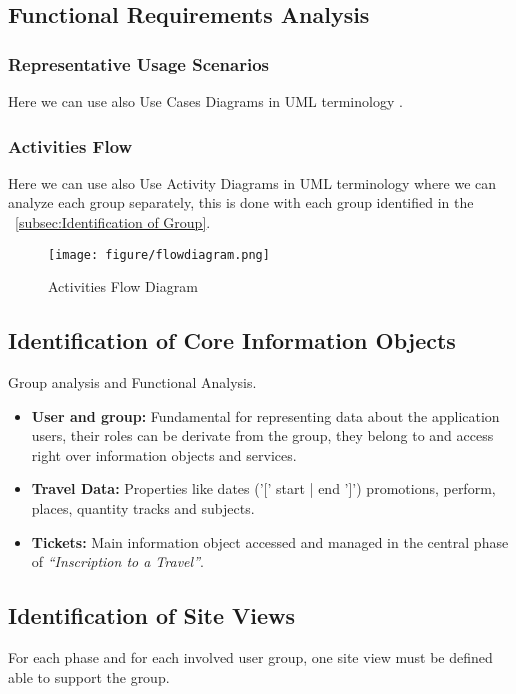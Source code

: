 \documentclass[a4paper]{memoir}
\begin{document}
	\subsection{Functional Requirements Analysis}
		\subsubsection{Representative Usage Scenarios}
			Here we can use also Use Cases Diagrams in \ac{UML} terminology \cite{Matera2003}.
		\subsubsection{Activities Flow}
			Here we can use also Use Activity Diagrams in \ac{UML} terminology \cite{Matera2003} where we can analyze each group separately, this is done with each group identified in the ~\ref{subsec:Identification of Group}.
			
			\begin{figure}[here]
				\texttt{[image: figure/flowdiagram.png]}
				\caption{Activities Flow Diagram}
				\label{fig:flowDiagram}
			\end{figure}
					
	\subsection{Identification of Core Information Objects}
		Group analysis and Functional Analysis.
		\begin{itemize}
			\item \textbf{User and group:} Fundamental for representing data about the application users, their roles can be derivate from the group, they belong to and access right over information objects and services.
			\item \textbf{Travel Data:} Properties like dates ('[' start | end ']') promotions, perform, places, quantity tracks and subjects.
			\item \textbf{Tickets:} Main information object accessed and managed in the central phase of \textit{``Inscription to a Travel''}.
		\end{itemize}
	\subsection{Identification of Site Views}
		For each phase and for each involved user group, one site view must be defined able to support the group.
		
\end{document}
